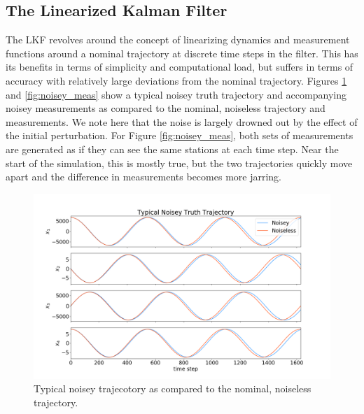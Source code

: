 \documentclass[11pt, a4paper]{article}
\begin{document}
\subsection{The Linearized Kalman Filter}
\label{sec: LKF}
The LKF revolves around the concept of linearizing dynamics and measurement functions around a nominal trajectory at discrete time steps in the filter. 
This has its benefits in terms of simplicity and computational load, but suffers in terms of accuracy with relatively large deviations from the nominal trajectory. 
Figures \ref{fig:noisey_states} and \ref{fig:noisey_meas} show a typical noisey truth trajectory and accompanying noisey measurements as compared to the nominal, noiseless trajectory and measurements. 
We note here that the noise is largely drowned out by the effect of the initial perturbation. 
For Figure \ref{fig:noisey_meas}, both sets of measurements are generated as if they can see the same stations at each time step. 
Near the start of the simulation, this is mostly true, but the two trajectories quickly move apart and the difference in measurements becomes more jarring.

\begin{figure}[H]
	\centering
	\includegraphics[width=\textwidth]{Figures/noisey_truth.png}
	\caption{Typical noisey trajecotory as compared to the nominal, noiseless trajectory.}
	\label{fig:noisey_states}
\end{figure}
\end{document}
